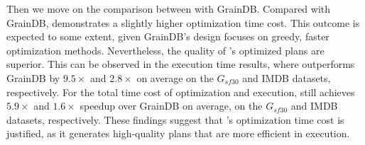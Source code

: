 Then we move on the comparison between \name with GrainDB. Compared with GrainDB, \name demonstrates a slightly higher optimization time cost. This outcome is expected to some extent, given GrainDB's design focuses on greedy, faster optimization methods.
Nevertheless, the quality of \name's optimized plans are superior. This can be observed in the execution time results, where \name outperforms GrainDB by $9.5\times$ and $2.8\times$ on average on the $G_{sf30}$ and IMDB datasets, respectively.
For the total time cost of optimization and execution, \name still achieves $5.9\times$ and $1.6\times$  speedup over GrainDB on average, on the $G_{sf30}$ and IMDB datasets, respectively.
These findings suggest that \name's optimization time cost is justified, as it generates high-quality plans that are more efficient in execution.


